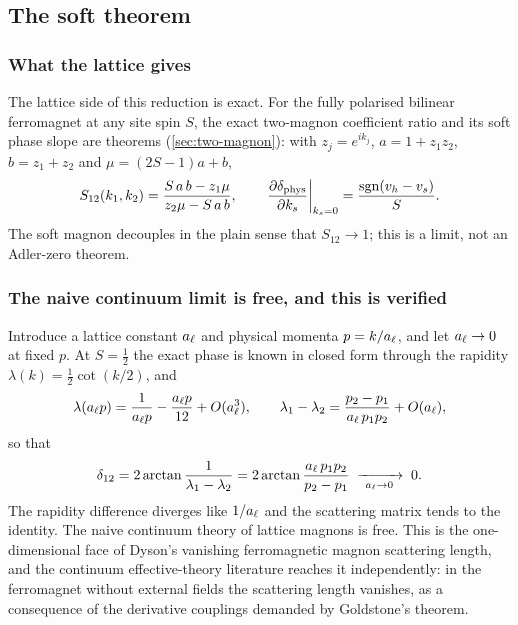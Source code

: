 \subsection{The soft theorem}
\label{sec:reduction-soft}

\subsubsection*{What the lattice gives}

The lattice side of this reduction is exact. For the fully polarised bilinear
ferromagnet at any site spin $S$, the exact two-magnon coefficient ratio and its
soft phase slope are theorems (\cref{sec:two-magnon}): with $z_j=e^{ik_j}$,
$a=1+z_1z_2$, $b=z_1+z_2$ and $\mu=(2S-1)a+b$,
\begin{equation}
  S_{12}(k_1,k_2)=\frac{S\,a\,b-z_1\mu}{z_2\mu-S\,a\,b},
  \qquad
  \left.\frac{\partial\delta_{\mathrm{phys}}}{\partial k_s}\right|_{k_s=0}
  =\frac{\operatorname{sgn}(v_h-v_s)}{S}.
  \label{eq:red-exact-ratio}
\end{equation}
The soft magnon decouples in the plain sense that $S_{12}\to1$; this is a limit,
not an Adler-zero theorem.


\subsubsection*{The naive continuum limit is free, and this is verified}

Introduce a lattice constant $a_{\ell}$ and physical momenta $p=k/a_{\ell}$,
and let $a_{\ell}\to0$ at fixed $p$. At $S=\tfrac12$ the exact phase is known
in closed form through the rapidity $\lambda(k)=\tfrac12\cot(k/2)$, and
\begin{equation}
  \lambda(a_{\ell} p)=\frac{1}{a_{\ell} p}-\frac{a_{\ell} p}{12}+O(a_{\ell}^3),
  \qquad
  \lambda_1-\lambda_2=\frac{p_2-p_1}{a_{\ell}\,p_1p_2}+O(a_{\ell}),
  \label{eq:red-rapidity}
\end{equation}
so that
\begin{equation}
  \delta_{12}
  =2\arctan\frac{1}{\lambda_1-\lambda_2}
  =2\arctan\frac{a_{\ell}\,p_1p_2}{p_2-p_1}
  \;\xrightarrow[\ a_{\ell}\to0\ ]{}\;0 .
  \label{eq:red-free}
\end{equation}
The rapidity difference diverges like $1/a_{\ell}$ and the scattering matrix
tends to the identity. The naive continuum theory of lattice magnons is free.
This is the one-dimensional face of Dyson's vanishing ferromagnetic magnon
scattering length, and the continuum effective-theory literature reaches it
independently: in the ferromagnet without external fields the scattering length
vanishes, as a consequence of the derivative couplings demanded by Goldstone's
theorem.

